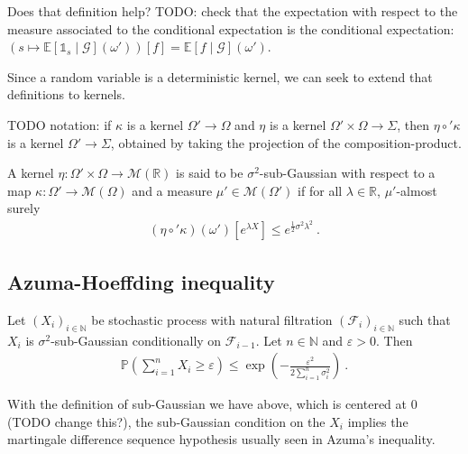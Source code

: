 Does that definition help? TODO: check that the expectation with respect to the measure associated to the conditional expectation is the conditional expectation: $(s \mapsto \mathbb{E}[\mathbb{1}_s \mid \mathcal G](\omega'))[f] = \mathbb{E}[f \mid \mathcal G](\omega')$.

Since a random variable is a deterministic kernel, we can seek to extend that definitions to kernels.

TODO notation: if $\kappa$ is a kernel $\Omega' \to \Omega$ and $\eta$ is a kernel $\Omega' \times \Omega \to \Sigma$, then $\eta \circ' \kappa$ is a kernel $\Omega' \to \Sigma$, obtained by taking the projection of the composition-product.

\begin{definition}
A kernel $\eta : \Omega' \times \Omega \to \mathcal M(\mathbb{R})$ is said to be $\sigma^2$-sub-Gaussian with respect to a map $\kappa : \Omega' \to \mathcal M(\Omega)$ and a measure $\mu' \in \mathcal M(\Omega')$ if for all $\lambda \in \mathbb{R}$, $\mu'$-almost surely
\begin{align*}
(\eta \circ' \kappa)(\omega')[e^{\lambda X}] \le e^{\frac{1}{2}\sigma^2\lambda^2} \: .
\end{align*}
\end{definition}

\subsection{Azuma-Hoeffding inequality}
\label{sub:azuma_hoeffding_inequality}

\begin{theorem}
Let $(X_i)_{i\in \mathbb{N}}$ be stochastic process with natural filtration $(\mathcal F_i)_{i\in \mathbb{N}}$ such that $X_i$ is $\sigma^2$-sub-Gaussian conditionally on $\mathcal F_{i-1}$. Let $n \in \mathbb{N}$ and $\varepsilon > 0$. Then
\begin{align*}
\mathbb{P}(\sum_{i=1}^n X_i \ge \varepsilon) \le \exp \left( - \frac{\varepsilon^2}{2 \sum_{i=1}^n \sigma_i^2} \right) \: .
\end{align*}
\end{theorem}

With the definition of sub-Gaussian we have above, which is centered at 0 (TODO change this?), the sub-Gaussian condition on the $X_i$ implies the martingale difference sequence hypothesis usually seen in Azuma's inequality.

